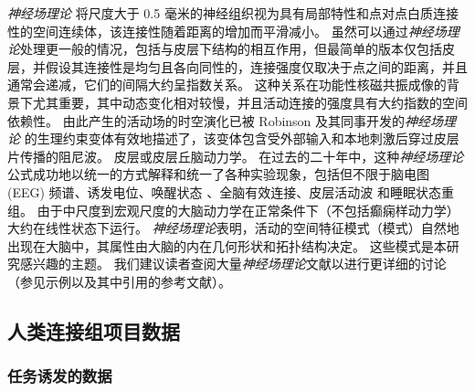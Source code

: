 \documentclass[lang=cn,a4paper,newtx,citestyle=gb7714-2015, bibstyle=gb7714-2015]{elegantpaper}
\begin{document}
\textit{神经场理论} 将尺度大于 0.5 毫米的神经组织视为具有局部特性和点对点白质连接性的空间连续体，该连接性随着距离的增加而平滑减小。
虽然可以通过\textit{神经场理论}处理更一般的情况，包括与皮层下结构的相互作用\cite{robinson2005multiscale,sanz2018nftsim}，但最简单的版本仅包括皮层，并假设其连接性是均匀且各向同性的，连接强度仅取决于点之间的距离，并且通常会递减，它们的间隔大约呈指数关系\cite{deco2008dynamic,braitenberg2013cortex,henderson2014relations,robinson2019physical}。
这种关系在功能性核磁共振成像的背景下尤其重要，其中动态变化相对较慢，并且活动连接的强度具有大约指数\cite{braitenberg2013cortex,robinson2019physical,robinson2012interrelating}的空间依赖性。
由此产生的活动场的时空演化已被 Robinson 及其同事开发的\textit{神经场理论} 的生理约束变体有效地描述了\cite{beurle1956properties,da1976models,jirsa1996field,robinson1997propagation,nunez1974brain}，该变体包含受外部输入和本地刺激后穿过皮层片传播的阻尼波。
皮层或皮层丘脑动力学。
在过去的二十年中，这种\textit{神经场理论} 公式成功地以统一的方式解释和统一了各种实验现象，包括但不限于脑电图 (EEG) 频谱\cite{robinson2001prediction,pang2018neural}、诱发电位\cite{rennie2002unified,mukta2020evoked}、唤醒状态\cite{abeysuriya2015physiologically,assadzadeh2018necessity} 、全脑有效连接\cite{robinson2012interrelating}、皮层活动波\cite{gabay2018dynamics} 和睡眠状态重组\cite{robinson2005multiscale}。
由于中尺度到宏观尺度的大脑动力学在正常条件下（不包括癫痫样动力学）\cite{robinson2019physical}大约在线性状态下运行。
\textit{神经场理论}表明，活动的空间特征模式（模式）自然地出现在大脑中\cite{wang2016brain,roberts2017consistency}，其属性由大脑的内在几何形状和拓扑结构决定\cite{preti2019decoupling,gabay2018dynamics}。
这些模式是本研究感兴趣的主题。
我们建议读者查阅大量\textit{神经场理论}文献以进行更详细的讨论（参见示例\cite{wright1995simulation,jirsa1996field,robinson1997propagation,robinson2016eigenmodes,gabay2017cortical,wang2016brain,honey2007network,van2013wu,glasser2016multi,naze2021robustness}以及其中引用的参考文献）。



\subsection{人类连接组项目数据} \label{sec:sup_2}

\subsubsection{任务诱发的数据} \label{sec:sup_2_1}
\end{document}
